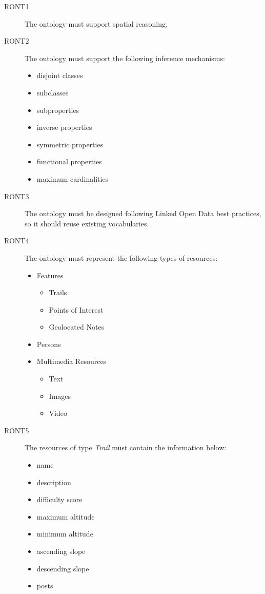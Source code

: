 \begin{description}
\item[RONT1] The ontology must support spatial reasoning.
\item[RONT2] The ontology must support the following inference mechanisms:
\begin{itemize}
\item disjoint classes
\item subclasses
\item subproperties
\item inverse properties
\item symmetric properties
\item functional properties
\item maximum cardinalities
\end{itemize}
\item[RONT3] The ontology must be designed following Linked Open Data best practices, so it should reuse existing vocabularies.
\item[RONT4] The ontology must represent the following types of resources:
\begin{itemize}
 \item Features
 \begin{itemize}
  \item Trails
  \item Points of Interest
  \item Geolocated Notes
 \end{itemize}
 \item Persons
 \item Multimedia Resources
 \begin{itemize}
  \item Text
  \item Images
  \item Video
 \end{itemize}
\end{itemize}
\item[RONT5] The resources of type \textit{Trail} must contain the information below:
\begin{itemize}
\item name
\item description
\item difficulty score
\item maximum altitude
\item minimum altitude
\item ascending slope
\item descending slope
\item posts

\end{itemize}
\end{description}
